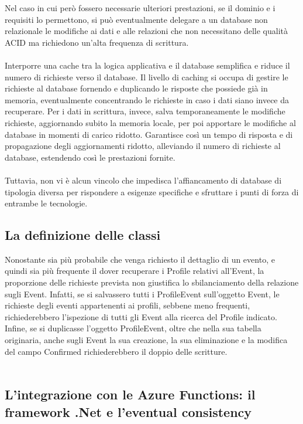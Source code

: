 Nel caso in cui però fossero necessarie ulteriori prestazioni, 
se il dominio e i requisiti lo permettono, 
si può eventualmente delegare a un database non relazionale le modifiche ai dati e alle relazioni 
che non necessitano delle qualità ACID ma richiedono un’alta frequenza di scrittura.\\
\\ 
Interporre una cache tra la logica applicativa e il database
semplifica e riduce il numero di richieste verso il database. 
Il livello di caching si occupa di gestire le richieste al database 
fornendo e duplicando le risposte che possiede già in memoria, 
eventualmente concentrando le richieste in caso i dati siano invece da recuperare. 
Per i dati in scrittura, invece, salva temporaneamente le modifiche richieste, 
aggiornando subito la memoria locale, 
per poi apportare le modifiche al database in momenti di carico ridotto. 
Garantisce così un tempo di risposta e di propagazione degli aggiornamenti ridotto,
alleviando il numero di richieste al database, estendendo così  le prestazioni fornite.\\
\\


Tuttavia, non vi è alcun vincolo che impedisca l'affiancamento di database di tipologia diversa 
per rispondere a esigenze specifiche e sfruttare i punti di forza di entrambe le tecnologie.
\\

\subsection{La definizione delle classi}
Nonostante sia più probabile che venga richiesto il dettaglio di un evento, 
e quindi sia più frequente il dover recuperare i Profile relativi all’Event, 
la proporzione delle richieste prevista non giustifica lo sbilanciamento della relazione sugli Event.
Infatti, se si salvassero tutti i ProfileEvent sull’oggetto Event, 
le richieste degli eventi appartenenti ai profili, sebbene meno frequenti, 
richiederebbero l’ispezione di tutti gli Event alla ricerca del Profile indicato. 
Infine, se si duplicasse l’oggetto ProfileEvent, 
oltre che nella sua tabella originaria, anche sugli Event la sua creazione, 
la sua eliminazione e la modifica del campo Confirmed richiederebbero il doppio delle scritture.\\
\\



\subsection{L'integrazione con le Azure Functions: il framework .Net e l'eventual consistency}

